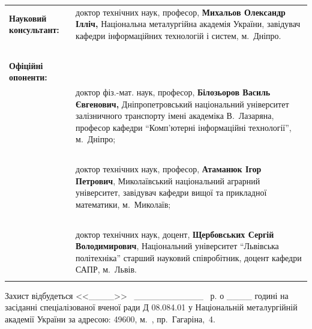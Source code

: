 \documentclass[a4paper,13pt]{atuaref}
\begin{document}
\noindent
\begin{tabular}{lp{}}
\textbf{Науковий консультант:}
&
доктор технічних наук, професор,\newline
\textbf{Михальов Олександр Ілліч,}\newline
Національна металургійна академія України, \newline
завідувач кафедри інформаційних технологій \newline
і систем, м.~Дніпро.
\\
{~} & {~}
\\
\textbf{Офіційні опоненти:}
{~}
\\
{~} &
доктор фіз.-мат. наук, професор,\newline
\textbf{Білозьоров Василь Євгенович,} \newline
Дніпропетровський національний університет \newline
залізничного транспорту
імені академіка В.~Лазаряна, \newline
професор кафедри ``Комп'ютерні інформаційні \newline
технології'', м.~Дніпро;
\\
{~} & {~}
\\
{~} &
доктор технічних наук, професор,\newline
\textbf{Атаманюк Ігор Петрович}, \newline
Миколаївський національний аграрний університет, \newline
завідувач кафедри вищої та прикладної математики, м.~Миколаїв;
\\
{~} & {~}
\\
{~} &
доктор технічних наук, доцент,\newline
\textbf{Щербовських Сергій Володимирович}, \newline
Національний університет ``Львівська політехніка'' \newline
старший науковий співробітник, доцент кафедри САПР, м.~Львів.
\\
&
\end{tabular}


\vfill

Захист відбудеться
<<\_\_\_\_>>
~\_\_\_\_\_\_\_\_\_\_\_
\bookyear~р. о \_\_\_\_ годині
на засіданні спеціалізованої вченої ради Д 08.084.01 у Національній
металургійній академії України за адресою: 49600, м.~\cityUa,
пр.~Гагаріна,~4.
\end{document}
